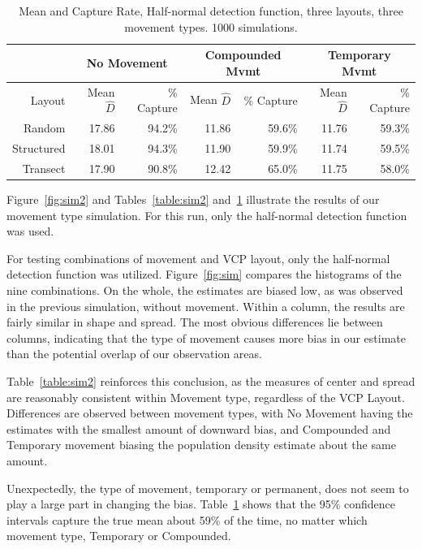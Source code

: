 \documentclass[12pt]{article}
\begin{document}
\begin{table}

	\begin{tabular}{ r| r r| r r| r r|}
	
		& \multicolumn{2}{|c|}{No Movement}	& \multicolumn{2}{|c|}{Compounded Mvmt}	& \multicolumn{2}{|c|}{Temporary Mvmt}\\ 
 \hline \hline
 
 Layout		& Mean $\hat{D}$	& \% Capture & Mean $\hat{D}$ & \% Capture & Mean $\hat{D}$ & \% Capture	\\ \hline \hline
 Random		& 17.86 			& 94.2\% 		& 11.86	& 59.6\%	& 11.76	& 59.3\% \\
 Structured	& 18.01 			& 94.3\% 		& 11.90 & 59.9\% 	& 11.74 & 59.5\% \\
 Transect	& 17.90 			& 90.8\% 		& 12.42 & 65.0\% 	& 11.75 & 58.0\% \\ \hline

	\end{tabular}
	\caption{Mean and Capture Rate, Half-normal detection function, three layouts, three movement types. 1000 simulations.}
	\label{table:sim2capture}
\end{table}

Figure~\ref{fig:sim2} and Tables~\ref{table:sim2} and~\ref{table:sim2capture} illustrate the results of our movement type simulation. For this run, only the half-normal detection function was used. 

For testing combinations of movement and VCP layout, only the half-normal detection function was utilized. Figure~\ref{fig:sim} compares the histograms of the nine combinations. On the whole, the estimates are biased low, as was observed in the previous simulation, without movement. Within a column, the results are fairly similar in shape and spread. The most obvious differences lie between columns, indicating that the type of movement causes more bias in our estimate than the potential overlap of our observation areas. 

Table~\ref{table:sim2} reinforces this conclusion, as the measures of center and spread are reasonably consistent within Movement type, regardless of the VCP Layout. Differences are observed between movement types, with No Movement having the estimates with the smallest amount of downward bias, and Compounded and Temporary movement biasing the population density estimate about the same amount.

Unexpectedly, the type of movement, temporary or permanent, does not seem to play a large part in changing the bias. Table~\ref{table:sim2capture} shows that the 95\% confidence intervals \parencite{quang1993} capture the true mean about 59\% of the time, no matter which movement type, Temporary or Compounded.
\end{document}
